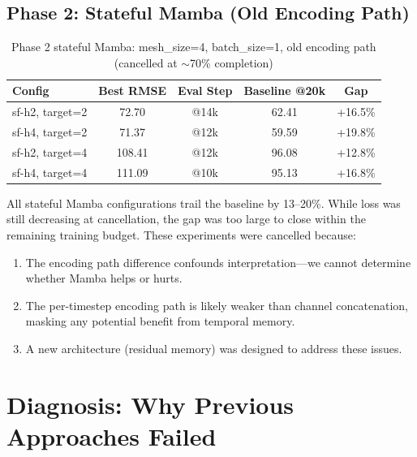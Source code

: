 \documentclass[11pt,a4paper]{article}
\begin{document}
\subsection{Phase 2: Stateful Mamba (Old Encoding Path)}

\begin{table}[H]
\centering
\caption{Phase 2 stateful Mamba: mesh\_size=4, batch\_size=1, old encoding path (cancelled at $\sim$70\% completion)}
\label{tab:phase2_stateful}
\begin{tabular}{lcccc}
\toprule
Config & Best RMSE & Eval Step & Baseline @20k & Gap \\
\midrule
sf-h2, target=2 & 72.70 & @14k & 62.41 & +16.5\% \\
sf-h4, target=2 & 71.37 & @12k & 59.59 & +19.8\% \\
sf-h2, target=4 & 108.41 & @12k & 96.08 & +12.8\% \\
sf-h4, target=4 & 111.09 & @10k & 95.13 & +16.8\% \\
\bottomrule
\end{tabular}
\end{table}

All stateful Mamba configurations trail the baseline by 13--20\%. While loss was still decreasing at cancellation, the gap was too large to close within the remaining training budget. These experiments were cancelled because:
\begin{enumerate}[nosep]
    \item The encoding path difference confounds interpretation---we cannot determine whether Mamba helps or hurts.
    \item The per-timestep encoding path is likely weaker than channel concatenation, masking any potential benefit from temporal memory.
    \item A new architecture (residual memory) was designed to address these issues.
\end{enumerate}

\section{Diagnosis: Why Previous Approaches Failed}
\end{document}
